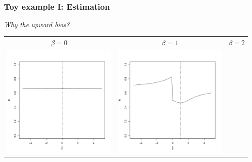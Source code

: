 \documentclass{beamer}
\begin{document}
\begin{frame}
\frametitle{Toy example I: Estimation}
\emph{Why the upward bias?}
\begin{center}
\begin{tabular}{ccc}
$\beta = 0$ &
$\beta = 1$ &
$\beta = 2$ \\
\includegraphics[scale = .2]{risk_0.pdf} &
\includegraphics[scale = .2]{risk_1.pdf} & 

\end{tabular}
\end{center}
\end{frame}
\end{document}

